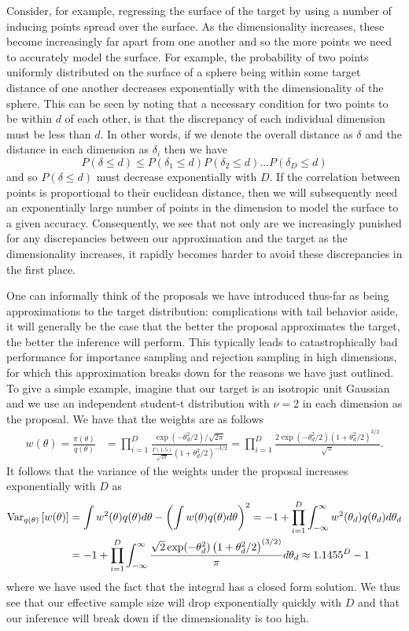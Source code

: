 Consider, for example,
regressing the surface of the target by using a number of inducing points spread over the
surface.  As the dimensionality increases, these become increasingly far apart from one
another and so the more points we need to accurately model the surface.  For example, the
probability of two points uniformly distributed on the surface of a sphere being within
some target distance of one another decreases exponentially
with the dimensionality of the sphere.  This can be seen by noting that a necessary condition
for two points to be within $d$ of each other, is that the discrepancy of each individual dimension 
must be less than $d$.  In other words, if we denote the overall distance as $\delta$ and 
the distance in each dimension as $\delta_i$ then we have 
\[
P(\delta \le d)\le P(\delta_1 \le d)  P(\delta_2 \le d)  \dots  P(\delta_D \le d) 
\]
and so $P(\delta \le d)$ must decrease exponentially with $D$.  
If the correlation between points is proportional to their euclidean distance, then
we will subsequently need an exponentially large number of points in the dimension
to model the surface to a given accuracy.  Consequently, we see that not only are we
increasingly punished for any discrepancies between our approximation and the target
as the dimensionality increases, it rapidly becomes harder to avoid these discrepancies
in the first place.

One can informally think of the proposals we have introduced thus-far as being
approximations to the target distribution: complications with tail behavior aside, it will
generally be the case that the better the proposal approximates the target, the better the
inference will perform.  This typically leads to catastrophically bad performance for
importance sampling and rejection sampling in high dimensions, for which this approximation
breaks down for the reasons we have just outlined.  To give a simple example, imagine that
our target is an isotropic unit Gaussian and we use an independent student-t distribution
with $\nu=2$ in each dimension as the proposal.  We have that the weights are as follows
\begin{align}
w(\theta) = \frac{\pi(\theta)}{q(\theta)} &= \prod_{i=1}^{D} \frac{\exp(-\theta_d^2/2)/\sqrt{2\pi}}
{\frac{\Gamma(1.5)}{\sqrt{2\pi}}\left(1+\theta_d^2/2\right)^{-3/2} } =\prod_{i=1}^{D} \frac{2 \exp(-\theta_d^2/2) \left(1+\theta_d^2/2\right)^{3/2}}{\sqrt{\pi}}.
\end{align}
It follows that the variance of the weights under the proposal increases exponentially
with $D$ as
\begin{align}
\mathrm{Var}_{q(\theta)} \left[w(\theta)\right] &= \int w^2(\theta)q(\theta)d\theta -
\left(\int w(\theta)q(\theta)d\theta\right)^2 
=-1+ \prod_{i=1}^{D} \int_{-\infty}^{\infty} w^2(\theta_d)q(\theta_d)d\theta_d \nonumber\\
&=-1+\prod_{i=1}^{D} \int_{-\infty}^{\infty} \frac{\sqrt{2}\exp(-\theta_d^2)\left(1+\theta^2_d/2\right)^{(3/2)}}
{\pi}d\theta_d \approx 1.1455^D-1
\end{align}
where we have used the fact that the integral has a closed form solution.
We thus see that our effective sample size
will drop exponentially quickly with $D$ and that our inference will break down if
the dimensionality is too high.

